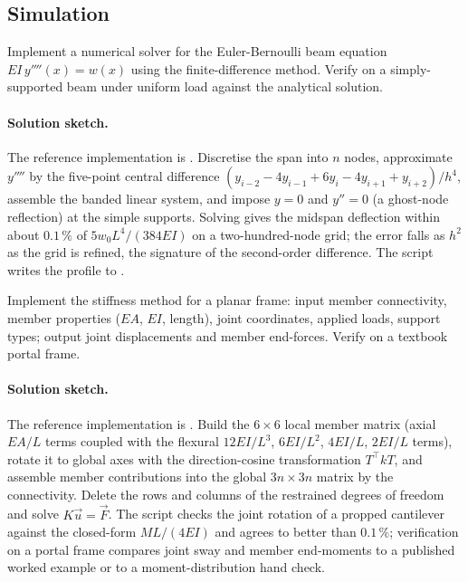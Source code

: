 \subsection*{Simulation}

\begin{exercise}
Implement a numerical solver for the Euler-Bernoulli beam equation
$EI\,y''''(x) = w(x)$ using the finite-difference method. Verify on
a simply-supported beam under uniform load against the analytical
solution.

\paragraph{Solution sketch.} The reference implementation is
. Discretise the span into $n$ nodes,
approximate $y''''$ by the five-point central difference $(y_{i-2} -
4y_{i-1} + 6y_i - 4y_{i+1} + y_{i+2})/h^4$, assemble the banded linear
system, and impose $y = 0$ and $y'' = 0$ (a ghost-node reflection) at
the simple supports. Solving gives the midspan deflection within about
$0.1\,\%$ of $5w_0L^4/(384EI)$ on a two-hundred-node grid; the error
falls as $h^2$ as the grid is refined, the signature of the
second-order difference. The script writes the profile to
.
\end{exercise}

\begin{exercise}
Implement the stiffness method for a planar frame: input member
connectivity, member properties ($EA$, $EI$, length), joint
coordinates, applied loads, support types; output joint
displacements and member end-forces. Verify on a textbook portal
frame.

\paragraph{Solution sketch.} The reference implementation is
. Build the $6\times 6$ local member
matrix (axial $EA/L$ terms coupled with the flexural $12EI/L^3$,
$6EI/L^2$, $4EI/L$, $2EI/L$ terms), rotate it to global axes with the
direction-cosine transformation $T^{\!\top}kT$, and assemble member
contributions into the global $3n\times 3n$ matrix by the connectivity.
Delete the rows and columns of the restrained degrees of freedom and
solve $K\vec{u} = \vec{F}$. The script checks the joint rotation of a
propped cantilever against the closed-form $ML/(4EI)$ and agrees to
better than $0.1\,\%$; verification on a portal frame compares joint
sway and member end-moments to a published worked example or to a
moment-distribution hand check.
\end{exercise}


